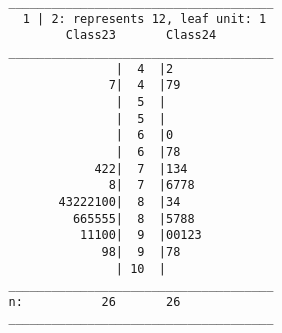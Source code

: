 \documentclass{article}\usepackage[]{graphicx}\usepackage[]{color}
\makeatletter
\newenvironment{kframe}{%
 \def\at@end@of@kframe{}%
 \ifinner\ifhmode%
  \def\at@end@of@kframe{\end{minipage}}%
  \begin{minipage}{\columnwidth}%
 \fi\fi%
 \def\FrameCommand##1{\hskip\@totalleftmargin \hskip-\fboxsep
 \colorbox{shadecolor}{##1}\hskip-\fboxsep
     \hskip-\linewidth \hskip-\@totalleftmargin \hskip\columnwidth}%
 \MakeFramed {\advance\hsize-\width
   \@totalleftmargin\z@ \linewidth\hsize
   \@setminipage}}%
 {\par\unskip\endMakeFramed%
 \at@end@of@kframe}
\newenvironment{knitrout}{}{} %
\makeatother
\begin{document}
\begin{knitrout}
\color{fgcolor}\begin{kframe}
\begin{verbatim}
   _____________________________________
     1 | 2: represents 12, leaf unit: 1 
           Class23       Class24    
   _____________________________________
                  |  4  |2
                 7|  4  |79      
                  |  5  |
                  |  5  |
                  |  6  |0             
                  |  6  |78            
               422|  7  |134           
                 8|  7  |6778        
          43222100|  8  |34          
            665555|  8  |5788        
             11100|  9  |00123        
                98|  9  |78           
                  | 10  |               
   _____________________________________
   n:           26       26         
   _____________________________________
\end{verbatim}
\end{kframe}
\end{knitrout}
\end{document}
